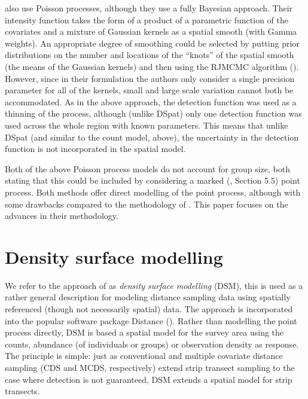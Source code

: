 \documentclass[a4paper,12pt]{article}
\begin{document}

\cite{Niemi:2010kx} also use Poisson processes, although they use a fully Bayesian approach. Their intensity function takes the form of a product of a parametric function of the covariates and a mixture of Gaussian kernels as a spatial smooth (with Gamma weights). An appropriate degree of smoothing could be selected by putting prior distributions on the number and locations of the ``knots'' of the spatial smooth (the means of the Gaussian kernels) and then using the RJMCMC algorithm (\cite{GREEN:1995dg}). However, since in their formulation the authors only consider a single precision parameter for all of the kernels, small and large scale variation cannot both be accommodated. As in the above approach, the detection function was used as a thinning of the process, although (unlike DSpat) only one detection function was used across the whole region with known parameters. This means that unlike DSpat (and similar to the count model, above), the uncertainty in the detection function is not incorporated in the spatial model.

Both of the above Poisson process models do not account for group size, both stating that this could be included by considering a marked (\cite{cox1980point}, Section 5.5) point process. Both methods offer direct modelling of the point process, although with some drawbacks compared to the methodology of \cite{Hedley:2004et}. This paper focuses on the advances in their methodology.

\section*{Density surface modelling}
\label{s:dsm}

We refer to the approach of \cite{Hedley:2004et} as \textit{density surface modelling} (DSM), this is used as a rather general description for modeling distance sampling data using spatially referenced (though not necessarily spatial) data. The approach is incorporated into the popular software package Distance (\cite{Thomas:2010cf}). Rather than modelling the point process directly, DSM is based a spatial model for the survey area using the counts, abundance (of individuals or groups) or observation density as response. The principle is simple: just as conventional and multiple covariate distance sampling (CDS and MCDS, respectively) extend strip transect sampling to the case where detection is not guaranteed, DSM extends a spatial model for strip transects.
\end{document}
